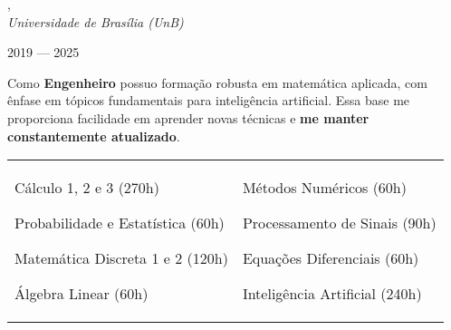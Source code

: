 , \\
\textit{Universidade de Brasília (UnB)}\strut \hfill 2019 --- 2025\\

\vspace*{7pt}

Como \textbf{Engenheiro} possuo formação robusta em matemática aplicada, com ênfase em tópicos fundamentais para inteligência artificial. Essa base me proporciona facilidade em aprender novas técnicas e \textbf{me manter constantemente atualizado}.

\vspace*{7pt}

\begin{tabular}{@{}ll@{}}
  \begin{minipage}[t]{0.45\textwidth}
    \begin{zitemize}
      \item Cálculo 1, 2 e 3 (270h)
      \item Probabilidade e Estatística (60h)
      \item Matemática Discreta 1 e 2 (120h)
      \item Álgebra Linear (60h)
    \end{zitemize}
  \end{minipage}
  &
  \begin{minipage}[t]{0.45\textwidth}
    \begin{zitemize}
      \item Métodos Numéricos (60h)
      \item Processamento de Sinais (90h)
      \item Equações Diferenciais (60h)
      \item Inteligência Artificial (240h)
    \end{zitemize}
  \end{minipage}
\end{tabular}

\vspace*{7pt}
